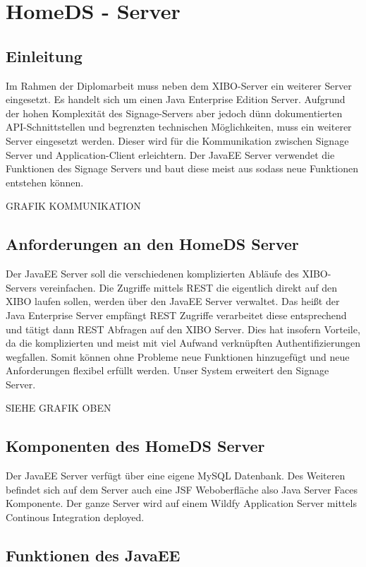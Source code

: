 \chapter{HomeDS - Server}
\section{Einleitung}\label{sec:einleitung}
Im Rahmen der Diplomarbeit muss neben dem XIBO-Server ein weiterer Server eingesetzt. Es handelt sich um einen Java Enterprise Edition Server. Aufgrund der hohen Komplexität des Signage-Servers aber jedoch dünn dokumentierten API-Schnittstellen und begrenzten technischen Möglichkeiten, muss ein  weiterer Server eingesetzt werden. Dieser wird für die Kommunikation zwischen Signage Server und Application-Client erleichtern. Der JavaEE Server verwendet die Funktionen des Signage Servers und baut diese meist aus sodass neue Funktionen entstehen können.

GRAFIK KOMMUNIKATION
 
\section{Anforderungen an den HomeDS Server}\label{sec:homeds}
Der JavaEE Server soll die verschiedenen komplizierten Abläufe des XIBO-Servers vereinfachen. Die Zugriffe mittels REST die eigentlich direkt auf den XIBO laufen sollen, werden über den JavaEE Server verwaltet. Das heißt der Java Enterprise Server empfängt REST Zugriffe verarbeitet diese entsprechend und tätigt dann REST Abfragen auf den XIBO Server. Dies hat insofern Vorteile, da die komplizierten und meist mit viel Aufwand verknüpften Authentifizierungen wegfallen. Somit können ohne Probleme neue Funktionen hinzugefügt und neue Anforderungen flexibel erfüllt werden. Unser System erweitert  den Signage Server.

SIEHE GRAFIK OBEN
 
\section{Komponenten des HomeDS Server}\label{sec:homedscomponents}
Der JavaEE Server verfügt über eine eigene MySQL Datenbank. Des Weiteren befindet sich auf dem Server auch eine JSF Weboberfläche also Java Server Faces Komponente. Der ganze Server wird auf einem Wildfy Application Server mittels Continous Integration deployed. 
 
\section{Funktionen des JavaEE}
